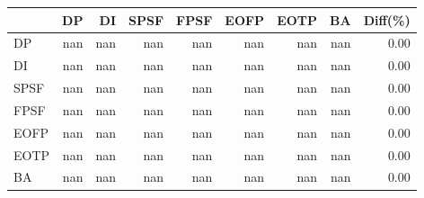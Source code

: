 \begin{tabular}{l|rrrrrrr|r}
\toprule
 & DP & DI & SPSF & FPSF & EOFP & EOTP & BA & Diff(\%)  \\
\midrule
DP & nan & nan & nan & nan & nan & nan & nan & 0.00  \\
DI & nan & nan & nan & nan & nan & nan & nan & 0.00  \\
SPSF & nan & nan & nan & nan & nan & nan & nan & 0.00  \\
FPSF & nan & nan & nan & nan & nan & nan & nan & 0.00  \\
EOFP & nan & nan & nan & nan & nan & nan & nan & 0.00  \\
EOTP & nan & nan & nan & nan & nan & nan & nan & 0.00  \\
BA & nan & nan & nan & nan & nan & nan & nan & 0.00  \\
\bottomrule
\end{tabular}

